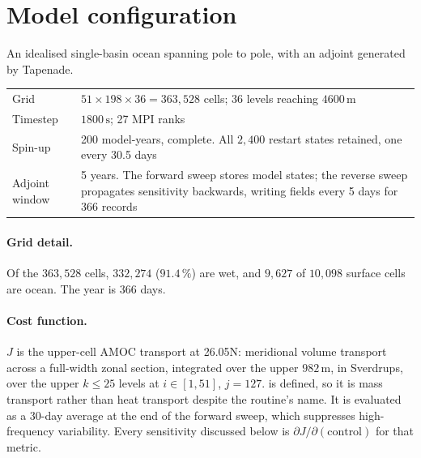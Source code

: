 \section{Model configuration}
\label{sec:modelconfig}

An idealised single-basin ocean spanning pole to pole, with an adjoint generated
by Tapenade.

\begin{center}
\begin{tabularx}{\textwidth}{@{}Y{0.45}Y{1.55}@{}}
\toprule
Grid & $51\times198\times36 = 363{,}528$ cells; 36 levels reaching
  $4600\,\mathrm{m}$\\
Timestep & $1800\,\mathrm{s}$; 27 MPI ranks\\
Spin-up & 200 model-years, complete. All $2{,}400$ restart states retained, one
  every 30.5 days\\
Adjoint window & 5 years. The forward sweep stores model states; the reverse
  sweep propagates sensitivity backwards, writing fields every 5 days for 366
  records\\
\bottomrule
\end{tabularx}
\end{center}

\paragraph{Grid detail.}
Of the $363{,}528$ cells, $332{,}274$ ($91.4\,\%$) are wet, and $9{,}627$ of
$10{,}098$ surface cells are ocean. The year is 366 days.

\paragraph{Cost function.}
$J$ is the upper-cell AMOC transport at 26.05\dg N: meridional volume transport
across a full-width zonal section, integrated over the upper $982\,\mathrm{m}$,
in Sverdrups, over the upper $k\le25$ levels at $i\in[1,51]$, $j=127$.
 is defined, so it is mass transport
rather than heat transport despite the routine's name. It is evaluated as a
30-day average at the end of the forward
sweep, which suppresses high-frequency variability. Every sensitivity discussed
below is $\partial J/\partial(\text{control})$ for that metric.

